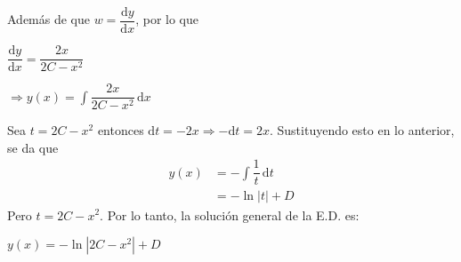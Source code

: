\documentclass[fleqn]{article}
\begin{document}
    Además de que $ w = \dfrac{\mathrm{d} y}{\mathrm{d}x} $, por lo que

    $ \dfrac{\mathrm{d} y}{\mathrm{d}x} = \dfrac{2x}{2C - x^2} $

    $ \Longrightarrow y(x) = \displaystyle \int \dfrac{2x}{2C - x^2} \, \mathrm{d}x $

    Sea $ t = 2C - x^2 $ entonces $ \mathrm{d}t = -2x \Longrightarrow - \mathrm{d}t = 2x $. Sustituyendo esto en lo anterior, se da que
    \begin{equation*}
        \begin{split}
            y(x) &= - \displaystyle \int \dfrac{1}{t} \, \mathrm{d}t \\
            &= - \ln |t| + D
        \end{split}
    \end{equation*}
    Pero $ t = 2C - x^2 $. Por lo tanto, la solución general de la E.D. es: 
    
    $ y(x) = - \ln \left \lvert 2C - x^2 \right \lvert + D $
\end{document}
